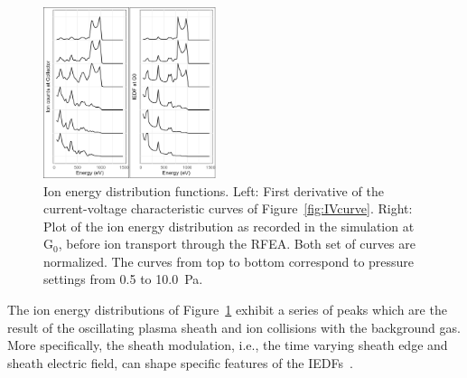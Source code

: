\begin{figure}[htbp]
\centering
\includegraphics[width=0.45\textwidth]{Figures/PressureScan.jpeg}
\caption{Ion energy distribution functions. Left: First derivative of the current-voltage characteristic curves of Figure~\ref{fig:IVcurve}. Right: Plot of the ion energy distribution as recorded in the simulation at G$_0$, before ion transport through the RFEA. Both set of curves are normalized. The curves from top to bottom correspond to pressure settings from 0.5 to 10.0~Pa.}
\label{fig:PressureScan}
\end{figure}

The ion energy distributions of Figure~\ref{fig:PressureScan} exhibit a series of peaks which are the result of the oscillating plasma sheath and ion collisions with the background gas. More specifically, the sheath modulation, i.e., the time varying sheath edge and sheath electric field, can shape specific features of the IEDFs~\cite{Wild1989,Wild1991}. 

 